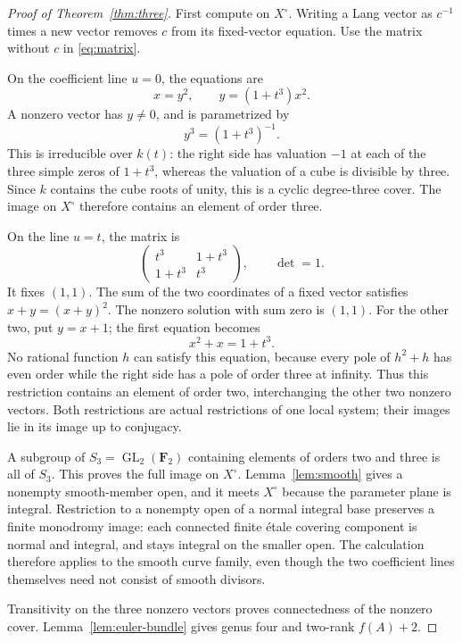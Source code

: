 \documentclass[11pt]{article}
\theoremstyle{remark}\newtheorem{remark}[theorem]{Remark}
\newcommand{\FF}{\mathbf F}
\newcommand{\GL}{\operatorname{GL}}
\begin{document}
\begin{proof}[Proof of Theorem~\ref{thm:three}]
First compute on $X^\circ$. Writing a Lang vector as $c^{-1}$ times a new vector removes $c$ from its fixed-vector equation. Use the matrix without $c$ in \eqref{eq:matrix}.

On the coefficient line $u=0$, the equations are
\[
                x=y^2,\qquad y=(1+t^3)x^2.
\]
A nonzero vector has $y\ne0$, and is parametrized by
\begin{equation}\label{eq:kummer}
                           y^3=(1+t^3)^{-1}.
\end{equation}
This is irreducible over $k(t)$: the right side has valuation $-1$ at each of the three simple zeros of $1+t^3$, whereas the valuation of a cube is divisible by three. Since $k$ contains the cube roots of unity, this is a cyclic degree-three cover. The image on $X^\circ$ therefore contains an element of order three.

On the line $u=t$, the matrix is
\[
             \begin{pmatrix}t^3&1+t^3\\1+t^3&t^3\end{pmatrix},
             \qquad\det=1.
\]
It fixes $(1,1)$. The sum of the two coordinates of a fixed vector satisfies $x+y=(x+y)^2$. The nonzero solution with sum zero is $(1,1)$. For the other two, put $y=x+1$; the first equation becomes
\begin{equation}\label{eq:AS-slice}
                            x^2+x=1+t^3.
\end{equation}
No rational function $h$ can satisfy this equation, because every pole of $h^2+h$ has even order while the right side has a pole of order three at infinity. Thus this restriction contains an element of order two, interchanging the other two nonzero vectors. Both restrictions are actual restrictions of one local system; their images lie in its image up to conjugacy.

A subgroup of $S_3=\GL_2(\FF_2)$ containing elements of orders two and three is all of $S_3$. This proves the full image on $X^\circ$. Lemma~\ref{lem:smooth} gives a nonempty smooth-member open, and it meets $X^\circ$ because the parameter plane is integral. Restriction to a nonempty open of a normal integral base preserves a finite monodromy image: each connected finite \'etale covering component is normal and integral, and stays integral on the smaller open. The calculation therefore applies to the smooth curve family, even though the two coefficient lines themselves need not consist of smooth divisors.

Transitivity on the three nonzero vectors proves connectedness of the nonzero cover. Lemma~\ref{lem:euler-bundle} gives genus four and two-rank $f(A)+2$.
\end{proof}
\end{document}
